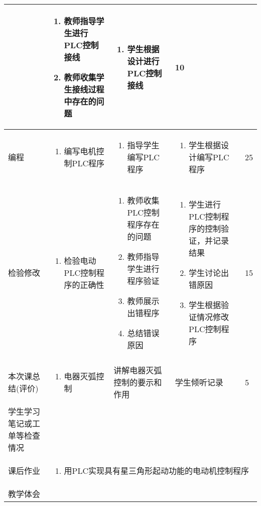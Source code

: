 {\begin{landscape}
\begin{longtable}{|m{10mm}|m{50mm}|m{50mm}|m{50mm}|m{15mm}|}
\begin{enumerate}
\end{enumerate} &\begin{enumerate}
\item 教师指导学生进行PLC控制接线
\item 教师收集学生接线过程中存在的问题
\end{enumerate} &\begin{enumerate}
\item 学生根据设计进行PLC控制接线
\end{enumerate} &10 \\\hline
编程&
\begin{enumerate}
\item 编写电机控制PLC程序
\end{enumerate} &\begin{enumerate}
\item 指导学生编写PLC程序
\end{enumerate} &\begin{enumerate}
\item 学生根据设计编写PLC程序
\end{enumerate} &25 \\\hline
\centering 检验修改&\begin{enumerate}
\item 检验电动PLC控制程序的正确性
\end{enumerate}&\begin{enumerate}
\item 教师收集PLC控制程序存在的问题
\item 教师指导学生进行程序验证
\item 教师展示出错程序
\item 总结错误原因
\end{enumerate}&\begin{enumerate}
\item 学生进行PLC控制程序的控制验证，并记录结果
\item 学生讨论出错原因
\item 学生根据验证情况修改PLC控制程序
\end{enumerate}&15 \\\hline
\centering 本次课总结(评价)&\begin{enumerate}
\item 电器灭弧控制 
\end{enumerate}&讲解电器灭弧控制的要示和作用  &学生倾听记录 &5 \\\hline
\centering 学生学习笔记或工单等检查情况&\multicolumn{4}{m{165mm}|}{\quad}\\\hline
\centering 课后作业&\multicolumn{4}{m{165mm}|}{\begin{enumerate}
\item 用PLC实现具有星三角形起动功能的电动机控制程序
\end{enumerate}}\\\hline
\centering 教学体会&\multicolumn{4}{m{165mm}|}{\quad}\\
\end{longtable}


\end{landscape}}
